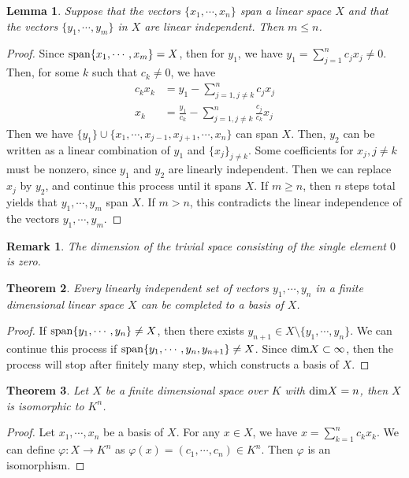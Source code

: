 \documentclass[11pt]{book}
\newtheorem{theorem}{Theorem}[section]
\newtheorem{lemma}[theorem]{Lemma}
\newtheorem{remark}{Remark}[section]
\theoremstyle{definition}
\numberwithin{equation}{chapter}
\begin{document}
\begin{lemma}
Suppose that the vectors $\{x_1,\cdots,x_n\}$ span a linear space $X$ and that
the vectors $\{y_1,\cdots,y_m\}$ in $X$ are linear independent. Then $m \leq n$.
\end{lemma}
\begin{proof}
Since ${\rm span}\{x_1,\cdots,x_m\} = X$, then for $y_1$, we have $y_1 = \sum^n_{j=1}c_j x_j \neq 0$. Then, for some $k$ such that $c_k\neq 0$, we have
\begin{align*}
    c_k x_k & = y_1 - \sum^n_{j=1, j\neq k} c_j x_j \\
    x_k & = \frac{y_1}{c_k} - \sum^n_{j=1, j\neq k} \frac{c_j}{c_k} x_j
\end{align*}
Then we have $\{y_1\}\cup\{x_1,\cdots,x_{j-1},x_{j+1},\cdots, x_n\}$ can span $X$. Then, $y_2$ can be written as a linear combination of $y_1$ and $\{x_j\}_{j\neq k}$. Some coefficients for $x_j, j\neq k$ must be nonzero, since $y_1$ and $y_2$ are linearly independent. Then we can replace $x_j$ by $y_2$, and continue this process until it spans $X$. If $m \geq n$, then $n$ steps total yields that $y_1,\cdots,y_m$ span $X$. If $m > n$, this contradicts the linear independence of the vectors $y_1,\cdots,y_m$.
\end{proof}

\begin{remark}
The dimension of the trivial space consisting of the single element $0$ is zero.
\end{remark}

\medskip

\begin{theorem}
Every linearly independent set of vectors $y_1,\cdots,y_n$ in a finite dimensional linear space $X$ can be completed to a basis of $X$.
\end{theorem}
\begin{proof}
If ${\rm span}\{y_1,\cdots,y_n\} \neq X$, then there exists $y_{n+1}\in X \setminus \{y_1,\cdots,y_n\}$. We can continue this process if ${\rm span}\{y_1,\cdots,y_n, y_{n+1}\}\neq X$. Since ${\rm dim}X \subset \infty$, then the process will stop after finitely many step, which  constructs a basis of $X$.
\end{proof}

\medskip

\begin{theorem}
Let $X$ be a finite dimensional space over $K$ with ${\rm dim}X = n$, then $X$ is isomorphic to $K^n$.
\end{theorem}
\begin{proof}
Let $x_1, \cdots, x_n$ be a basis of $X$. For any $x\in X$, we have $x = \sum^n_{k=1}c_k x_k$. We can define $\varphi: X\to K^n$ as $\varphi(x) = (c_1, \cdots, c_n) \in K^n$. Then $\varphi$ is an isomorphism.
\end{proof}
\end{document}
